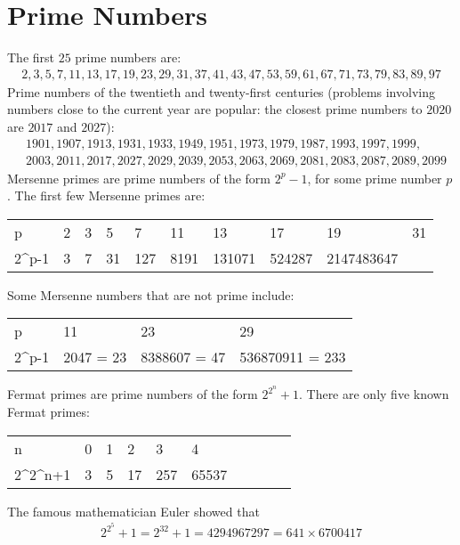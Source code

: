 \documentclass[12pt]{article}
\begin{document}
\section*{Prime Numbers}
The first $25$ prime numbers are:
\begin{align*}
2, 3, 5, 7, 11, 13, 17, 19, 23, 29, 31, 37, 41, 43, 47, 53, 59, 61, 67, 71, 73, 79, 83, 89, 97
\end{align*}
Prime numbers of the twentieth and twenty-first centuries (problems involving numbers close to the current year are popular: the closest prime numbers to $2020$ are $2017$ and $2027$):
\begin{align*}
& 1901, 1907, 1913, 1931, 1933, 1949, 1951, 1973, 1979, 1987, 1993, 1997, 1999, \\ 
& 2003, 2011, 2017, 2027, 2029, 2039, 2053, 2063, 2069, 2081, 2083, 2087, 2089, 2099
\end{align*}
Mersenne primes are prime numbers of the form $2^{p}-1$, for some prime number $p$. The first few Mersenne primes are:
\begin{center}
\begin{tabular}{L|LLLLLLLLL}
p       & 2 & 3 & 5  & 7   & 11   & 13   & 17     & 19     & 31 \\
2^{p}-1 & 3 & 7 & 31 & 127 & 8191 & 131071 & 524287 & 2147483647 \\
\end{tabular}
\end{center}

Some Mersenne numbers that are not prime include:
\begin{center}
\begin{tabular}{L|LLL}
p       & 11                  & 23                          & 29 \\
2^{p}-1 & 2047 = 23  & 8388607  = 47  & 536870911 = 233   \\
\end{tabular}
\end{center}
     
Fermat primes are prime numbers of the form $2^{2^{n}}+1$. There are only five known Fermat primes:
\begin{center}
\begin{tabular}{L|LLLLLLLLL}
n           & 0 & 1 & 2  & 3   & 4 \\
2^{2^{n}}+1 & 3 & 5 & 17 & 257 & 65537 \\
\end{tabular}
\end{center}
The famous mathematician Euler showed that
\begin{align*}
2^{2^{5}}+1 = 2^{32}+1 = 4294967297 = 641 \times 6700417
\end{align*}
\end{document}
